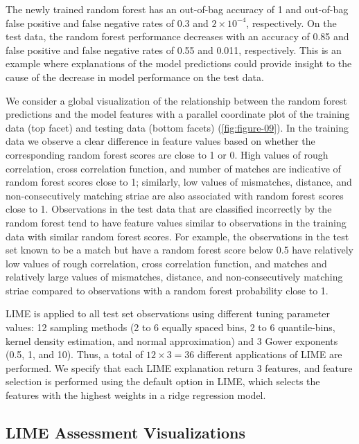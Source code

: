 \documentclass[AMS,STIX2COL]{WileyNJD-v2}\usepackage[]{graphicx}\usepackage[]{color}
\begin{document}
The newly trained random forest has an out-of-bag accuracy of 1 and out-of-bag false positive and false negative rates of 0.3 and \ensuremath{2\times 10^{-4}}, respectively. On the test data, the random forest performance decreases with an accuracy of 0.85 and false positive and false negative rates of 0.55 and 0.011, respectively. This is an example where explanations of the model predictions could provide insight to the cause of the decrease in model performance on the test data.

We consider a global visualization of the relationship between the random forest predictions and the model features with a parallel coordinate plot of the training data (top facet) and testing data (bottom facets)  (\autoref{fig:figure-09}). In the training data we observe a clear difference in feature values based on whether the corresponding random forest scores are close to 1 or 0. High values of rough correlation, cross correlation function, and number of matches are indicative of random forest scores close to 1; similarly, low values of mismatches, distance, and non-consecutively matching striae are also associated with random forest scores close to 1. Observations in the test data that are classified incorrectly by the random forest tend to have feature values similar to observations in the training data with similar random forest scores. For example, the observations in the test set known to be a match but have a random forest score below 0.5 have relatively low values of rough correlation, cross correlation function, and matches and relatively large values of mismatches, distance, and non-consecutively matching striae compared to observations with a random forest probability close to 1.

LIME is applied to all test set observations using different tuning parameter values: 12 sampling methods (2 to 6 equally spaced bins, 2 to 6 quantile-bins, kernel density estimation, and normal approximation) and 3 Gower exponents (0.5, 1, and 10). Thus, a total of $12\times 3=36$ different applications of LIME are performed. We specify that each LIME explanation return 3 features, and feature selection is performed using the default option in LIME, which selects the features with the highest weights in a ridge regression model.







\subsection{LIME Assessment Visualizations} \label{bullet-assess-ex}
\end{document}
